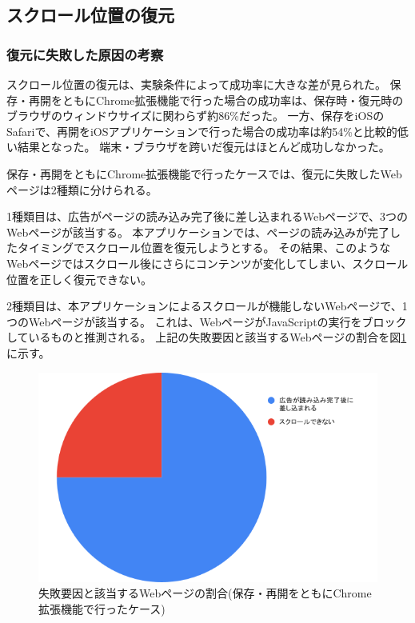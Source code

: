 \subsection{スクロール位置の復元}

\subsubsection{復元に失敗した原因の考察}
スクロール位置の復元は、実験条件によって成功率に大きな差が見られた。
保存・再開をともにChrome拡張機能で行った場合の成功率は、保存時・復元時のブラウザのウィンドウサイズに関わらず約86\%だった。
一方、保存をiOSのSafariで、再開をiOSアプリケーションで行った場合の成功率は約54\%と比較的低い結果となった。
端末・ブラウザを跨いだ復元はほとんど成功しなかった。

保存・再開をともにChrome拡張機能で行ったケースでは、復元に失敗したWebページは2種類に分けられる。

1種類目は、広告がページの読み込み完了後に差し込まれるWebページで、3つのWebページが該当する。
本アプリケーションでは、ページの読み込みが完了したタイミングでスクロール位置を復元しようとする。
その結果、このようなWebページではスクロール後にさらにコンテンツが変化してしまい、スクロール位置を正しく復元できない。

2種類目は、本アプリケーションによるスクロールが機能しないWebページで、1つのWebページが該当する。
これは、WebページがJavaScriptの実行をブロックしているものと推測される。
上記の失敗要因と該当するWebページの割合を図\ref{fig:evl-consideration-scroll-position-cause-ratio-chrome}に示す。

\begin{figure}[htbp]
  \caption{失敗要因と該当するWebページの割合(保存・再開をともにChrome拡張機能で行ったケース)}
  \label{fig:evl-consideration-scroll-position-cause-ratio-chrome}
  \begin{center}
    \includegraphics[bb=0 0 600 371,width=15cm]{img/060_evaluation/consideration/scroll_position/cause-ratio-chrome.pdf}
  \end{center}
\end{figure}

